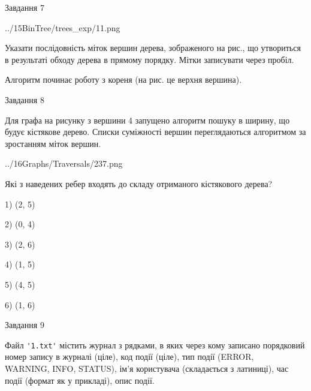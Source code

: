 \documentclass[12pt, ukrainian]{article}
\def\code#1{\Verb!#1!}
\begin{document}
{\vspace{10mm}\par

\newpage
\begin{minipage}[t]{9.7cm}
               
{\begin{center}Завдання {7}\end{center}}
\vspace{-4mm}

\begin{center}
	{../15BinTree/trees_exp/11.png}
\end{center}
Указати послідовність міток вершин дерева, зображеного на рис., що утвориться в результаті обходу дерева в прямому порядку. Мітки записувати через пробіл.\par Алгоритм починає роботу з кореня (на рис. це верхня вершина).\par

\end{minipage}
\vline \hspace{8mm}
\begin{minipage}[t]{8.0cm}
               
{\begin{center}Завдання {8}\end{center}}
\vspace{-4mm}
Для графа на рисунку з вершини 4 запущено алгоритм пошуку в ширину, що будує кістякове дерево. Списки суміжності вершин переглядаються алгоритмом за зростанням міток вершин.\par
\begin{center}
	{../16Graphs/Traversals/237.png}
\end{center}
\par Які з наведених ребер входять до складу отриманого кістякового дерева?\par
1) (2, 5)\par
2) (0, 4)\par
3) (2, 6)\par
4) (1, 5)\par
5) (4, 5)\par
6) (1, 6)\par
{\vskip 15pt} \par

\end{minipage}

               
{\begin{center}Завдання {9}\end{center}}
\vspace{-4mm}
Файл \code{'1.txt'} містить журнал з рядками, в яких через кому записано поряд\-ко\-вий номер запису в журналі (ціле), код події (ціле), тип події (ERROR, \\WARNING, INFO, STATUS), ім'я користувача (складається з латиниці), час події (фор\-мат як у прикладі), опис події.

}
\end{document}
